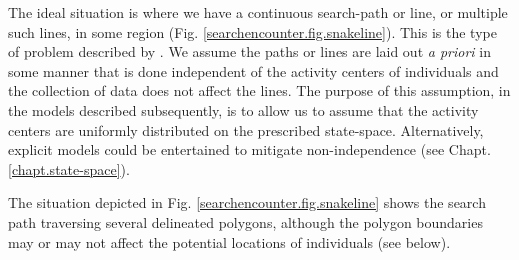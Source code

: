 The ideal situation is where we have a continuous search-path or line,
or multiple such lines, in some region
(Fig. \ref{searchencounter.fig.snakeline}).  This is the type of
problem described by \citet{royle_etal:2011mee}. 
We assume the paths
or lines are laid out {\it a priori} in some manner that is done
independent of
the activity centers of individuals and the collection of data does
not affect the lines.  The purpose of this assumption, in the models
described subsequently, is to allow us to assume that the activity
centers are uniformly distributed on the prescribed
state-space. Alternatively, explicit models could be entertained to
mitigate non-independence (see Chapt. \ref{chapt.state-space}).

The situation depicted
 in Fig. \ref{searchencounter.fig.snakeline} shows the search path
 traversing several delineated polygons, although the polygon
 boundaries may or may not affect the potential locations of
 individuals (see below).


